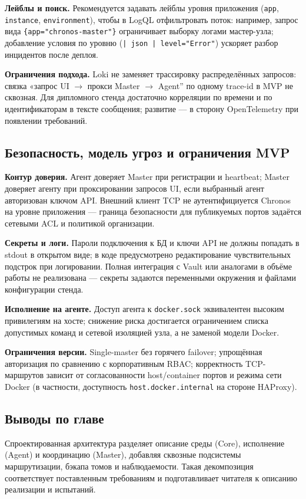 \textbf{Лейблы и поиск.} Рекомендуется задавать лейблы уровня приложения (\texttt{app}, \texttt{instance}, \texttt{environment}), чтобы в LogQL отфильтровать поток: например, запрос вида \texttt{\{app="chronos-master"\}} ограничивает выборку логами мастер-узла; добавление условия по уровню (\texttt{| json | level="Error"}) ускоряет разбор инцидентов после деплоя.

\textbf{Ограничения подхода.} Loki не заменяет трассировку распределённых запросов: связка «запрос UI $\rightarrow$ прокси Master $\rightarrow$ Agent'' по одному trace-id в MVP не сквозная. Для дипломного стенда достаточно корреляции по времени и по идентификаторам в тексте сообщения; развитие --- в сторону OpenTelemetry при появлении требований.

\subsection{Безопасность, модель угроз и ограничения MVP}

\textbf{Контур доверия.} Агент доверяет Master при регистрации и heartbeat; Master доверяет агенту при проксировании запросов UI, если выбранный агент авторизован ключом API. Внешний клиент TCP не аутентифициуется Chronos на уровне приложения --- граница безопасности для публикуемых портов задаётся сетевыми ACL и политикой организации.

\textbf{Секреты и логи.} Пароли подключения к БД и ключи API не должны попадать в stdout в открытом виде; в коде предусмотрено редактирование чувствительных подстрок при логировании. Полная интеграция с Vault или аналогами в объёме работы не реализована --- секреты задаются переменными окружения и файлами конфигурации стенда.

\textbf{Исполнение на агенте.} Доступ агента к \texttt{docker.sock} эквивалентен высоким привилегиям на хосте; снижение риска достигается ограничением списка допустимых команд и сетевой изоляцией узла, а не заменой модели Docker.

\textbf{Ограничения версии.} Single-master без горячего failover; упрощённая авторизация по сравнению с корпоративным RBAC; корректность TCP-маршрутов зависит от согласованности host/container портов и режима сети Docker (в частности, доступность \texttt{host.docker.internal} на стороне HAProxy).

\subsection{Выводы по главе}

Спроектированная архитектура разделяет описание среды (Core), исполнение (Agent) и координацию (Master), добавляя сквозные подсистемы маршрутизации, бэкапа томов и наблюдаемости. Такая декомпозиция соответствует поставленным требованиям и подготавливает читателя к описанию реализации и испытаний.
